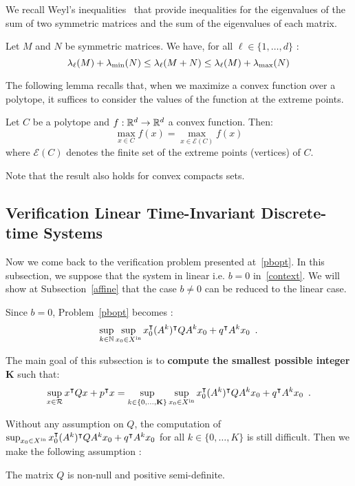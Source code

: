 \documentclass[10pt]{article}
\begin{document}
We recall Weyl's inequalities~\cite{horn1990matrix} that provide inequalities for the eigenvalues of the sum of two symmetric matrices and the sum of the eigenvalues of each matrix.  
\begin{lemma}
\label{le}
Let $M$ and $N$ be symmetric matrices. We have, for all $\ell\in\{1,\ldots,d\}$ :
\[
\lambda_\ell(M)+\lambda_{\operatorname{min}}(N)\leq \lambda_\ell(M+N)\leq \lambda_\ell(M)+\lambda_{\operatorname{max}}(N)
\]
\end{lemma}
The following lemma recalls that, when we maximize a convex function over a polytope, it suffices to consider the values of the function at the extreme points. 
\begin{lemma}
\label{lemma2}
Let $C$ be a polytope and $f:\mathbb R^d\to\mathbb R^d$ a convex function. Then:
\[
\max_{x\in C} f(x)=\max_{x\in \mathcal{E}(C)} f(x)
\]
where $\mathcal{E}(C)$ denotes the finite set of the extreme points (vertices) of $C$.
\end{lemma}
Note that the result also holds for convex compacts sets.  
\subsection{Verification Linear Time-Invariant Discrete-time Systems}
\label{mainsub}
Now we come back to the verification problem presented at~\eqref{pbopt}. In this subsection, we suppose that the system in linear i.e. $b=0$ in~\eqref{context}. We will show at Subsection~\ref{affine} that the case $b\neq 0$ can be reduced to the linear case.

Since $b=0$, Problem~\eqref{pbopt} becomes :
\[
\sup_{k\in\mathbb{N}}\sup_{x_0\in X^\mathrm{in}} x_0^\intercal (A^k)^\intercal Q A^k x_0+q^\intercal A^k x_0\enspace .
\]

The main goal of this subsection is to {\bf compute the smallest possible integer} $\mathbf K$ such that:
\[
 \sup_{x\in\mathcal{R}} x^\intercal Q x+p^\intercal x=\sup_{k\in\{0,\ldots,\mathbf K\}}\sup_{x_0\in X^\mathrm{in}} x_0^\intercal (A^k)^\intercal Q A^k x_0+q^\intercal A^k x_0\enspace .
\]

Without any assumption on $Q$, the computation of  $\sup_{x_0\in X^\mathrm{in}} x_0^\intercal (A^k)^\intercal Q A^k x_0+q^\intercal A^k x_0$ for all $k\in\{0,\ldots,K\}$ is still difficult. Then we make the following assumption : 
\begin{assumption}
\label{assum1}
The matrix $Q$ is non-null and positive semi-definite.
\end{assumption}
\end{document}
